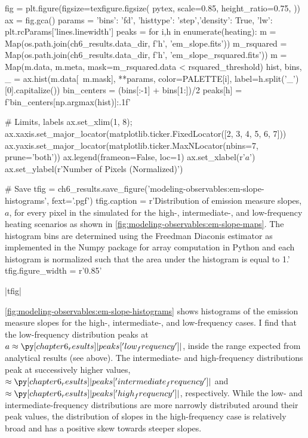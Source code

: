\begin{pycode}
fig = plt.figure(figsize=texfigure.figsize(
    pytex,
    scale=0.85,
    height_ratio=0.75,
))
ax = fig.gca()
params = {'bins': 'fd', 'histtype': 'step','density': True, 'lw': plt.rcParams['lines.linewidth']}
peaks = {}
for i,h in enumerate(heating):
    m = Map(os.path.join(ch6_results.data_dir, f'{h}', 'em_slope.fits'))
    m_rsquared = Map(os.path.join(ch6_results.data_dir, f'{h}', 'em_slope_rsquared.fits'))
    m = Map(m.data, m.meta, mask=m_rsquared.data < rsquared_threshold)
    hist, bins, _ = ax.hist(m.data[~m.mask], **params, color=PALETTE[i],
                            label=h.split('_')[0].capitalize())
    bin_centers = (bins[:-1] + bins[1:])/2
    peaks[h] = f'{bin_centers[np.argmax(hist)]:.1f}'

# Limits, labels
ax.set_xlim(1, 8);
ax.xaxis.set_major_locator(matplotlib.ticker.FixedLocator([2, 3, 4, 5, 6, 7]))
ax.yaxis.set_major_locator(matplotlib.ticker.MaxNLocator(nbins=7, prune='both'))
ax.legend(frameon=False, loc=1)
ax.set_xlabel(r'$a$')
ax.set_ylabel(r'Number of Pixels (Normalized)')

# Save
tfig = ch6_results.save_figure('modeling-observables:em-slope-histograms', fext='.pgf')
tfig.caption = r'Distribution of emission measure slopes, $a$, for every pixel in the simulated \AR{} for the high-, intermediate-, and low-frequency heating scenarios as shown in \autoref{fig:modeling-observables:em-slope-maps}. The histogram bins are determined using the Freedman Diaconis estimator \citep{freedman_histogram_1981} as implemented in the Numpy package for array computation in Python \citep{oliphant_guide_2006} and each histogram is normalized such that the area under the histogram is equal to 1.'
tfig.figure_width = r'0.85\textwidth'  
\end{pycode}
|tfig|

\autoref{fig:modeling-observables:em-slope-histograms} shows histograms of the emission measure slopes for the high-, intermediate-, and low-frequency cases. I find that the low-frequency distribution peaks at $a\approx\py[chapter6_results]|peaks['low_frequency']|$, inside the range expected from analytical results (see above). The intermediate- and high-frequency distributions peak at successively higher values, $\approx\py[chapter6_results]|peaks['intermediate_frequency']|$ and $\approx\py[chapter6_results]|peaks['high_frequency']|$, respectively. While the low- and intermediate-frequency distributions are more narrowly distributed around their peak values, the distribution of slopes in the high-frequency case is relatively broad and has a positive skew towards steeper slopes. 

